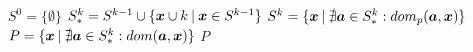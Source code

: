 \begin{algorithmic}[1] %
    \State $S^0 = \big\{\emptyset\big\}$
      \State $S_*^k = S^{k-1} \cup \{\boldsymbol{x} \cup k \:|\: \boldsymbol{x} \in S^{k-1}\}$
      \State $S^k = \{\boldsymbol{x} \:|\: \nexists \boldsymbol{a} \in S_*^k: dom_p(\boldsymbol{a}, \boldsymbol{x}) \}$
    \EndFor
  \State $P = \{\boldsymbol{x} \:|\: \nexists \boldsymbol{a} \in S_*^k: dom(\boldsymbol{a}, \boldsymbol{x}) \}$
  \State \Return $P$
  \EndFunction
\end{algorithmic}
